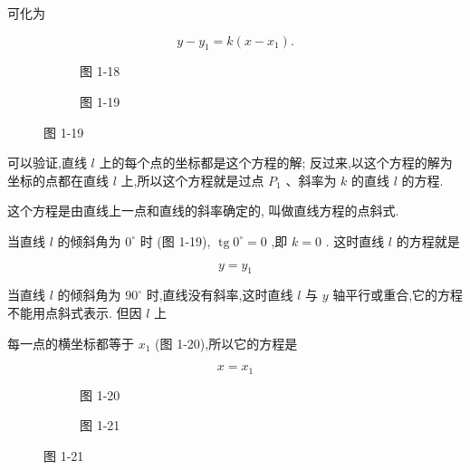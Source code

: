 \documentclass[lang=cn,newtx,12pt,scheme=chinese]{elegantbook}
\begin{document}
可化为

\begin{corollary}[点斜式]
\[
  y - {y}_{1} = k\left( {x - {x}_{1}}\right) .
\]
\end{corollary}

\begin{figure}[h]
	\centering
	\begin{subfigure}[h]{0.45\textwidth}
		\centering
		
		\caption{图 1-18}
	\end{subfigure}
	\hfill %
	\begin{subfigure}[h]{0.45\textwidth}
		\centering
		
		\caption{图 1-19}
	\end{subfigure}
\end{figure}

可以验证,直线 \(l\) 上的每个点的坐标都是这个方程的解; 反过来,以这个方程的解为坐标的点都在直线 \(l\) 上,所以这个方程就是过点 \({P}_{1}\) 、斜率为 \(k\) 的直线 \(l\) 的方程.

这个方程是由直线上一点和直线的斜率确定的, 叫做直线方程的点斜式.

当直线 \(l\) 的倾斜角为 \({0}^{ \circ }\) 时 (图 1-19), \(\operatorname{tg}{0}^{ \circ } = 0\) ,即 \(k = 0\) . 这时直线 \(l\) 的方程就是

\[
  y = {y}_{1}
\]

当直线 \(l\) 的倾斜角为 \({90}^{ \circ }\) 时,直线没有斜率,这时直线 \(l\) 与 \(y\) 轴平行或重合,它的方程不能用点斜式表示. 但因 \(l\) 上

每一点的横坐标都等于 \({x}_{1}\) (图 1-20),所以它的方程是

\[
  x = {x}_{1}
\]

\begin{figure}[h]
	\centering
	\begin{subfigure}[h]{0.45\textwidth}
		\centering
		
		\caption{图 1-20}
	\end{subfigure}
	\hfill %
	\begin{subfigure}[h]{0.45\textwidth}
		\centering
		
		\caption{图 1-21}
	\end{subfigure}
\end{figure}
\end{document}
